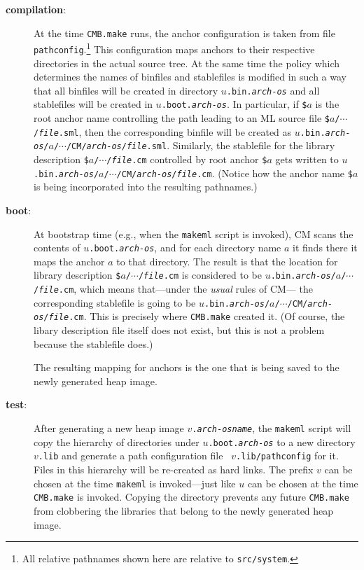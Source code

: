 \begin{description}
\item[{\bf compilation}:]
At the time {\tt CMB.make} runs, the anchor configuration is taken
from file {\tt pathconfig}.\footnote{All relative pathnames shown here
are relative to {\tt src/system}.}  This configuration maps anchors to
their respective directories in the actual source tree.  At the same
time the policy which determines the names of binfiles
and stablefiles is modified in such a way that all binfiles will be
created in directory {\tt $u$.bin.{\it arch}-{\it os}} and all
stablefiles will be created in {\tt $u$.boot.{\it arch}-{\it os}}.
In particular, if {\tt \$$a$} is the root anchor name controlling
the path leading to an ML source file
{\tt \$$a$/$\cdots$/{\it file}.sml},
then the corresponding binfile will be created as
{\tt $u$.bin.{\it arch}-{\it os}/$a$/$\cdots$/CM/{\it arch}-{\it os}/{\it file}.sml}.
Similarly, the stablefile for the library description
{\tt \$$a$/$\cdots$/{\it file}.cm} controlled by root anchor {\tt \$$a$}
gets written to
{\tt $u$.bin.{\it arch}-{\it os}/$a$/$\cdots$/CM/{\it arch}-{\it os}/{\it file}.cm}.
(Notice how the anchor name {\tt \$$a$} is being incorporated into the
resulting pathnames.)
\item[{\bf boot}:]
At bootstrap time (e.g., when the {\tt makeml} script is invoked), CM
scans the contents of {\tt $u$.boot.{\it arch}-{\it os}}, and for
each directory name $a$ it finds there it maps the anchor $a$ to that
directory.  The result is that the location for library description
{\tt \$$a$/$\cdots$/{\it file}.cm}
is considered to be
{\tt $u$.bin.{\it arch}-{\it os}/$a$/$\cdots$/{\it file}.cm}, which
means that---under the {\em usual} rules of CM---
the corresponding stablefile is going to be
{\tt $u$.bin.{\it arch}-{\it os}/$a$/$\cdots$/CM/{\it arch}-{\it
os}/{\it file}.cm}.  This is precisely where {\tt CMB.make} created
it.  (Of course, the libary description file itself does not exist,
but this is not a problem because the stablefile does.)

The resulting mapping for anchors is the one that is being saved to the
newly generated heap image.
\item[{\bf test}:]
After generating a new heap image {\tt $v$.{\it arch}-{\it osname}},
the {\tt makeml} script will copy the hierarchy of directories under
{\tt $u$.boot.{\it arch}-{\it os}} to a new directory {\tt $v$.lib}
and generate a path configuration file {\tt
$v$.lib/pathconfig} for it.  Files in this hierarchy will be re-created as
hard links.  The prefix $v$ can be chosen at the time {\tt makeml} is
invoked---just like $u$ can be chosen at the time {\tt CMB.make} is
invoked.  Copying the directory prevents any future {\tt CMB.make}
from clobbering the libraries that belong to the newly generated heap
image.


\end{description}

